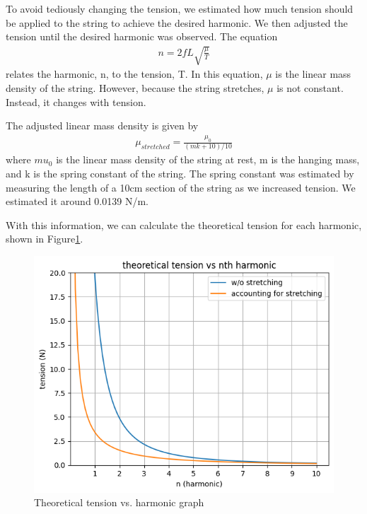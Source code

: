\documentclass[11pt]{article}
\begin{document}
    To avoid tediously changing the tension, we estimated how much tension should be applied to the string to achieve the desired harmonic.
    We then adjusted the tension until the desired harmonic was observed.
    The equation
    \begin{align*}
        n = 2fL \sqrt{\frac{\mu}{T}}
    \end{align*}
    relates the harmonic, n, to the tension, T\@.
    In this equation, $\mu$ is the linear mass density of the string.
    However, because the string stretches, $\mu$ is not constant.
    Instead, it changes with tension.

    The adjusted linear mass density is given by
    \begin{align*}
        \mu_{stretched} = \frac{\mu_0}{(mk+10)/10}
    \end{align*}
    where $mu_0$ is the linear mass density of the string at rest, m is the hanging mass, and k is the spring constant of the string.
    The spring constant was estimated by measuring the length of a 10cm section of the string as we increased tension.
    We estimated it around 0.0139 N/m.

    With this information, we can calculate the theoretical tension for each harmonic, shown in Figure\ref{fig:theoretical_tension}.

    \begin{figure}[H]
        \includegraphics[width=1\textwidth]{resources/images/p2 theoretical tension graph}
        \caption{Theoretical tension vs. harmonic graph}
        \label{fig:theoretical_tension}
    \end{figure}
\end{document}
